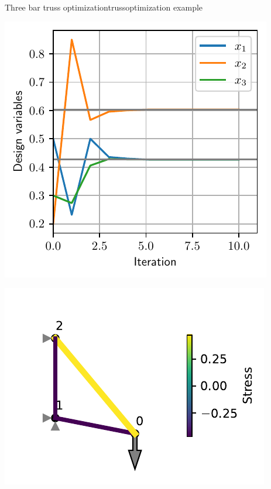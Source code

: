 \begin{example}{Three bar truss optimization}{trussoptimization example}
    \begin{minipage}{.5\textwidth}
        \centering
        \includegraphics[width=0.9\linewidth]{figures/three_bar_truss_variables.pdf}
    \end{minipage}%
    \begin{minipage}{.5\textwidth}
        \centering
        \includegraphics[width=0.9\linewidth]{figures/three_bar_truss_optimized.pdf}
    \end{minipage}
       
\end{example}

